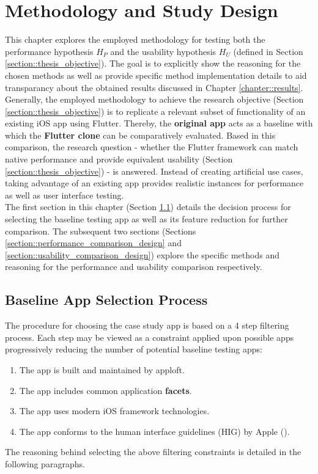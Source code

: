 \chapter{Methodology and Study Design} \label{chapter::study_design}
This chapter explores the employed methodology for testing both the performance hypothesis $H_P$ and the usability hypothesis $H_U$ (defined in Section \ref{section::thesis_objective}). 
The goal is to explicitly show the reasoning for the chosen methods as well as provide specific method implementation details to aid transparancy about the obtained results discussed in Chapter \ref{chapter::results}.\\
Generally, the employed methodology to achieve the research objective (Section \ref{section::thesis_objective}) is to replicate a relevant subset of functionality of an existing iOS app using Flutter. Thereby, the \textbf{original app} acts as a baseline with which the \textbf{Flutter clone} 
can be comparatively evaluated. Based in this comparison, the research question - whether the Flutter framework can match native performance and provide equivalent usability (Section \ref{section::thesis_objective}) - is answered.
Instead of creating artificial use cases, taking advantage of an existing app provides realistic instances for performance as well as user interface testing.\\
The first section in this chapter (Section \ref{section::facet_selection}) details the decision process for selecting the baseline testing app as well as its feature reduction for further comparison. 
The subsequent two sections (Sections \ref{section::performance_comparison_design} and \ref{section::usability_comparison_design}) explore the specific methods and reasoning for the performance and 
usability comparison respectively.




\section{Baseline App Selection Process} \label{section::facet_selection}
The procedure for choosing the case study app is based on a 4 step filtering process. Each step may be viewed as a constraint
applied upon possible apps progressively reducing the number of potential baseline testing apps:
\begin{enumerate}
    \item The app is built and maintained by apploft. \label{item::constraint_one}
    \item The app includes common application \textbf{facets}. \label{item::constraint_two}
    \item The app uses modern iOS framework technologies. \label{item::constraint_three}
    \item The app conforms to the human interface guidelines (HIG) by Apple (\cite{Apple2021a}). \label{item::constraint_four}
\end{enumerate}
The reasoning behind selecting the above filtering constraints is detailed in the following paragraphs.

